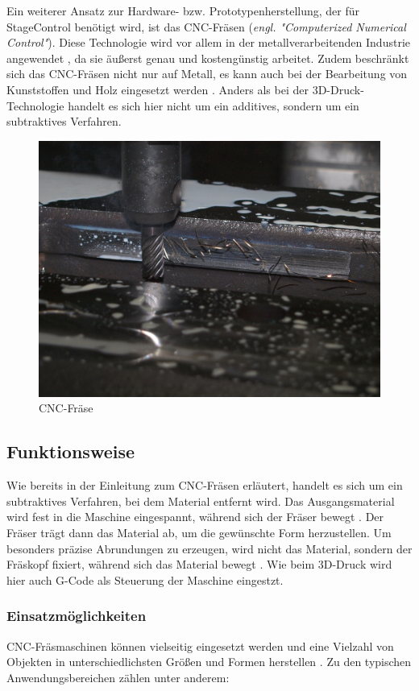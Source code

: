 Ein weiterer Ansatz zur Hardware- bzw. Prototypenherstellung, der für StageControl benötigt wird, ist das CNC-Fräsen (\textit{engl. "Computerized Numerical Control"}). Diese Technologie wird vor allem in der metallverarbeitenden Industrie angewendet \parencite{CNCFraesen}, da sie äußerst genau und kostengünstig arbeitet. Zudem beschränkt sich das CNC-Fräsen nicht nur auf Metall, es kann auch bei der Bearbeitung von Kunststoffen und Holz eingesetzt werden \parencite{CNCFraesen2}. Anders als bei der 3D-Druck-Technologie handelt es sich hier nicht um ein additives, sondern um ein subtraktives Verfahren.\\  \parencite{CNCFraesen3}


\begin{figure}[H]
	\centering
	\includegraphics[width=0.6\linewidth]{images/CNC.jpg}
	\caption[CNC-Fräse]{CNC-Fräse}
	\label{fig:cnc-fraese}
\end{figure}

\subsection{Funktionsweise}
Wie bereits in der Einleitung zum CNC-Fräsen erläutert, handelt es sich um ein subtraktives Verfahren, bei dem Material entfernt wird. Das Ausgangsmaterial wird fest in die Maschine eingespannt, während sich der Fräser bewegt \parencite{CNCFraesen2}. Der Fräser trägt dann das Material ab, um die gewünschte Form herzustellen. Um besonders präzise Abrundungen zu erzeugen, wird nicht das Material, sondern der Fräskopf fixiert, während sich das Material bewegt  \parencite{CNCFraesen3}. Wie beim 3D-Druck wird hier auch G-Code als Steuerung der Maschine eingestzt. \\



\subsubsection{Einsatzmöglichkeiten}
CNC-Fräsmaschinen können vielseitig eingesetzt werden und eine Vielzahl von Objekten in unterschiedlichsten Größen und Formen herstellen  \parencite{CNCFraesen2}. Zu den typischen Anwendungsbereichen zählen unter anderem:

